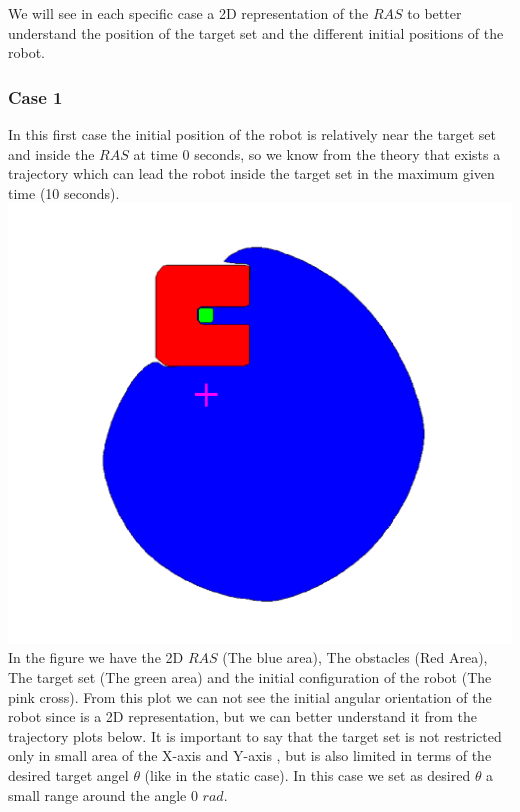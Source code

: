     We will see in each specific case a 2D representation of the $RAS$ to better understand the position of the target set and the different initial positions of the robot.
    \subsubsection{Case 1}
    In this first case the initial position of the robot is relatively near the target set and inside the $RAS$ at time 0 seconds, so we know from the theory that exists a trajectory which can lead the robot inside the target set in the maximum given time (10 seconds).
    \includegraphics[scale=0.25]{figures/dynamic2Dras1.png}
    \\
    In the figure we have the 2D $RAS$ (The blue area), The obstacles (Red Area), The target set (The green area) and the initial configuration of the robot (The pink cross). From this plot we can not see the initial angular orientation of the robot since is a 2D representation, but we can better understand it from the trajectory plots below. It is important to say that the target set is not restricted only in small area of the X-axis and Y-axis , but is also limited in terms of the desired target angel $\theta$ (like in the static case). In this case we set as desired $\theta$ a small range around the angle 0 $rad$.
    \\
